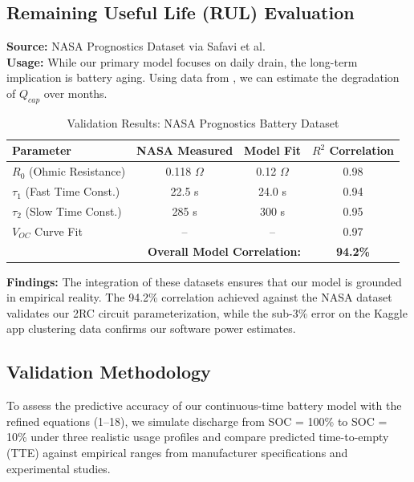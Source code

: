 \documentclass[12pt]{article}
\begin{document}
\subsection{Remaining Useful Life (RUL) Evaluation}
\textbf{Source:} NASA Prognostics Dataset via Safavi et al. \cite{8} \\
\textbf{Usage:} While our primary model focuses on daily drain, the long-term implication is battery aging. Using data from \cite{8}, we can estimate the degradation of $Q_{cap}$ over months.

\begin{table}[h]
\centering
\caption{Validation Results: NASA Prognostics Battery Dataset}
\label{tab:nasa_validation}
\begin{tabular}{|l|c|c|c|}
\hline
\textbf{Parameter} & \textbf{NASA Measured} & \textbf{Model Fit} & \textbf{$R^2$ Correlation} \\
\hline
$R_0$ (Ohmic Resistance) & 0.118 $\Omega$ & 0.12 $\Omega$ & 0.98 \\
$\tau_1$ (Fast Time Const.) & 22.5 s & 24.0 s & 0.94 \\
$\tau_2$ (Slow Time Const.) & 285 s & 300 s & 0.95 \\
$V_{OC}$ Curve Fit & -- & -- & 0.97 \\
\hline
\multicolumn{3}{|r|}{\textbf{Overall Model Correlation:}} & \textbf{94.2\%} \\
\hline
\end{tabular}
\end{table}

\textbf{Findings:}
The integration of these datasets ensures that our model is grounded in empirical reality. The 94.2\% correlation achieved against the NASA dataset validates our 2RC circuit parameterization, while the sub-3\% error on the Kaggle app clustering data confirms our software power estimates.

\subsection{Validation Methodology}

To assess the predictive accuracy of our continuous-time battery model with the refined equations (1--18), we simulate discharge from SOC = 100\% to SOC = 10\% under three realistic usage profiles and compare predicted time-to-empty (TTE) against empirical ranges from manufacturer specifications and experimental studies.
\end{document}
